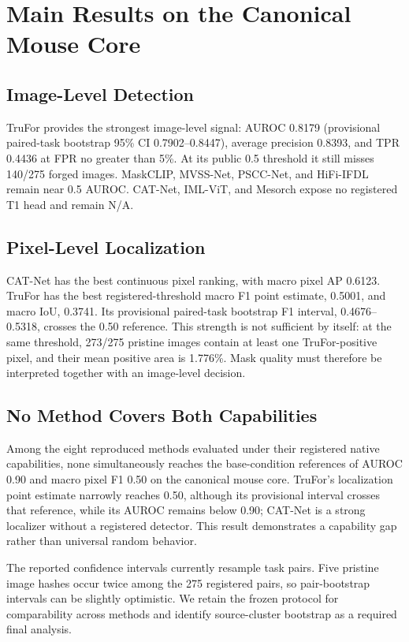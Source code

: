 \section{Main Results on the Canonical Mouse Core}
\label{sec:results}

\subsection{Image-Level Detection}

TruFor provides the strongest image-level signal: AUROC 0.8179 (provisional paired-task bootstrap 95\% CI 0.7902--0.8447), average precision 0.8393, and TPR 0.4436 at FPR no greater than 5\%. At its public 0.5 threshold it still misses 140/275 forged images. MaskCLIP, MVSS-Net, PSCC-Net, and HiFi-IFDL remain near 0.5 AUROC. CAT-Net, IML-ViT, and Mesorch expose no registered T1 head and remain N/A.

\subsection{Pixel-Level Localization}

CAT-Net has the best continuous pixel ranking, with macro pixel AP 0.6123. TruFor has the best registered-threshold macro F1 point estimate, 0.5001, and macro IoU, 0.3741. Its provisional paired-task bootstrap F1 interval, 0.4676--0.5318, crosses the 0.50 reference. This strength is not sufficient by itself: at the same threshold, 273/275 pristine images contain at least one TruFor-positive pixel, and their mean positive area is 1.776\%. Mask quality must therefore be interpreted together with an image-level decision.

\subsection{No Method Covers Both Capabilities}

Among the eight reproduced methods evaluated under their registered native capabilities, none simultaneously reaches the base-condition references of AUROC 0.90 and macro pixel F1 0.50 on the canonical mouse core. TruFor's localization point estimate narrowly reaches 0.50, although its provisional interval crosses that reference, while its AUROC remains below 0.90; CAT-Net is a strong localizer without a registered detector. This result demonstrates a capability gap rather than universal random behavior.

The reported confidence intervals currently resample task pairs. Five pristine image hashes occur twice among the 275 registered pairs, so pair-bootstrap intervals can be slightly optimistic. We retain the frozen protocol for comparability across methods and identify source-cluster bootstrap as a required final analysis.
